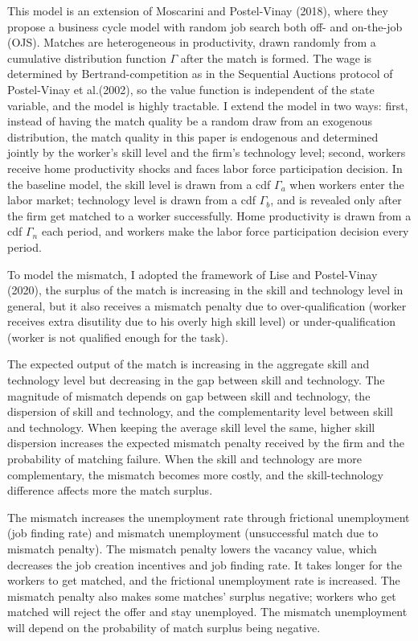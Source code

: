 \documentclass[12pt]{article}
\newcommand{\1}{\mathbb{1}}
\begin{document}
This model is an extension of Moscarini and Postel-Vinay (2018)\nocite{MPV2018}, where they propose a business cycle model with random job search both off- and on-the-job (OJS). Matches are heterogeneous in productivity, drawn randomly from a cumulative distribution function $\Gamma$ after the match is formed. The wage is determined by Bertrand-competition as in the Sequential Auctions protocol of Postel-Vinay et al.(2002)\nocite{PostelVinayetal2002}, so the value function is independent of the state variable, and the model is highly tractable. I extend the model in two ways: first, instead of having the match quality be a random draw from an exogenous distribution, the match quality in this paper is endogenous and determined jointly by the worker's skill level and the firm's technology level; second, workers receive home productivity shocks and faces labor force participation decision. In the baseline model, the skill level is drawn from a cdf $\Gamma_a$ when workers enter the labor market; technology level is drawn from a cdf $\Gamma_b$, and is revealed only after the firm get matched to a worker successfully. Home productivity is drawn from a cdf $\Gamma_n$ each period, and workers make the labor force participation decision every period. 

To model the mismatch, I adopted the framework of Lise and Postel-Vinay (2020)\nocite{LisePV2020}, the surplus of the match is increasing in the skill and technology level in general, but it also receives a mismatch penalty due to over-qualification (worker receives extra disutility due to his overly high skill level) or under-qualification (worker is not qualified enough for the task). 

The expected output of the match is increasing in the aggregate skill and technology level but decreasing in the gap between skill and technology. The magnitude of mismatch depends on gap between skill and technology, the dispersion of skill and technology, and the complementarity level between skill and technology. When keeping the average skill level the same, higher skill dispersion increases the expected mismatch penalty received by the firm and the probability of matching failure. When the skill and technology are more complementary, the mismatch becomes more costly, and the skill-technology difference affects more the match surplus. 

The mismatch increases the unemployment rate through frictional unemployment (job finding rate) and mismatch unemployment (unsuccessful match due to mismatch penalty). The mismatch penalty lowers the vacancy value, which decreases the job creation incentives and job finding rate. It takes longer for the workers to get matched, and the frictional unemployment rate is increased. The mismatch penalty also makes some matches' surplus negative; workers who get matched will reject the offer and stay unemployed. The mismatch unemployment will depend on the probability of match surplus being negative. 
\end{document}

